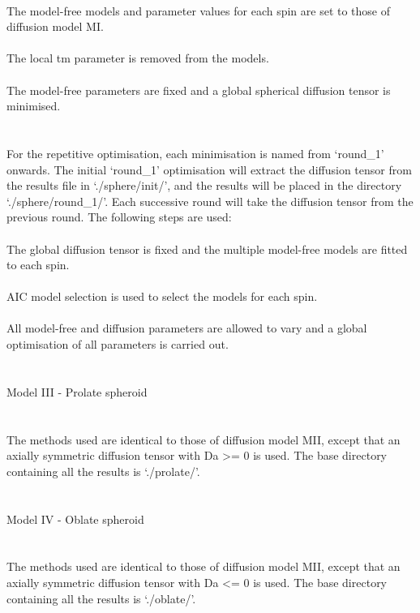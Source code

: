 \begin{htmlonly}
\begin{htmlonly}
\begin{exampleenv}
 \\
The model-free models and parameter values for each spin are set to those of diffusion model MI. \\
 \\
The local tm parameter is removed from the models. \\
 \\
The model-free parameters are fixed and a global spherical diffusion tensor is minimised. \\
 \\
 \\
For the repetitive optimisation, each minimisation is named from `round\_1' onwards.  The initial `round\_1' optimisation will extract the diffusion tensor from the results file in `./sphere/init/', and the results will be placed in the directory `./sphere/round\_1/'.  Each successive round will take the diffusion tensor from the previous round.  The following steps are used: \\
 \\
The global diffusion tensor is fixed and the multiple model-free models are fitted to each spin. \\
 \\
AIC model selection is used to select the models for each spin. \\
 \\
All model-free and diffusion parameters are allowed to vary and a global optimisation of all parameters is carried out. \\
 \\
 \\
Model III - Prolate spheroid \\
~~~~~~~~~~~~~~~~~~~~~~~~~~~~ \\
 \\
The methods used are identical to those of diffusion model MII, except that an axially symmetric diffusion tensor with Da >= 0 is used.  The base directory containing all the results is `./prolate/'. \\
 \\
 \\
Model IV - Oblate spheroid \\
~~~~~~~~~~~~~~~~~~~~~~~~~~ \\
 \\
The methods used are identical to those of diffusion model MII, except that an axially symmetric diffusion tensor with Da <= 0 is used.  The base directory containing all the results is `./oblate/'. \\
 \\

\end{exampleenv}
\end{htmlonly}
\end{htmlonly}
